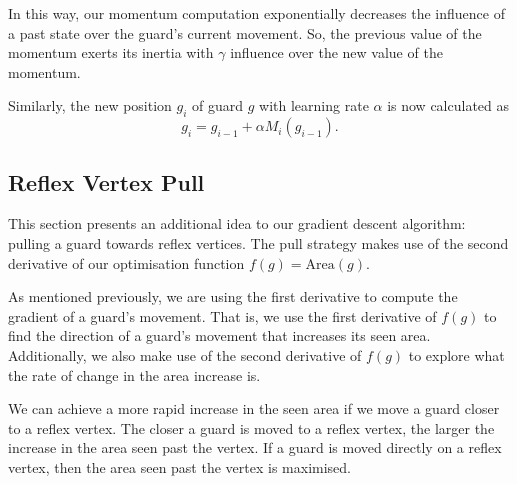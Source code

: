 In this way, our momentum computation exponentially decreases the influence of a past state over the guard's current movement. So, the previous value of the momentum  exerts its inertia with $\gamma$ influence over the new value of the momentum.

Similarly, the new position $g_i$ of guard $g$ with learning rate $\alpha$ is now calculated as $$g_i = g_{i - 1} + \alpha M_i(g_{i - 1}).$$

\subsection{Reflex Vertex Pull}

This section presents an additional idea to our gradient descent algorithm: pulling a guard towards reflex vertices. The pull strategy makes use of the second derivative of our optimisation function $f(g) = \text{Area}(g)$.



As mentioned previously, we are using the first derivative to compute the gradient of a guard's movement. That is, we use the first derivative of $f(g)$ to find the direction of a guard's movement that increases its seen area. Additionally, we  also make use of the second derivative of $f(g)$ to explore what the rate of change in the area increase is. 

We can achieve a more rapid increase in the seen area if we move a guard closer to a reflex vertex. The closer a guard is moved to a reflex vertex, the larger the increase in the area seen past the vertex. If a guard is moved directly on a reflex vertex, then the area seen past the vertex is maximised. 



